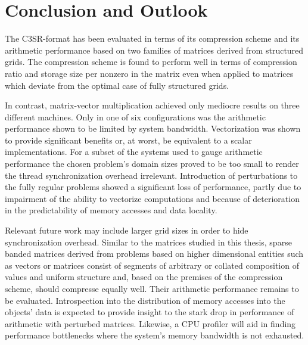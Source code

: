 \chapter{Conclusion and Outlook}

  The C3SR-format has been evaluated in terms of its compression scheme and its arithmetic performance based on two
  families of matrices derived from structured grids. The compression scheme is found to perform well in terms of
  compression ratio and storage size per nonzero in the matrix even when applied to matrices which deviate from the
  optimal case of fully structured grids.

  In contrast, matrix-vector multiplication achieved only mediocre results on three different machines. Only in one of
  six configurations was the arithmetic performance shown to be limited by system bandwidth. Vectorization was shown to
  provide significant benefits or, at worst, be equivalent to a scalar implementations. For a subset of the systems
  used to gauge arithmetic performance the chosen problem's domain sizes proved to be too small to render the thread
  synchronization overhead irrelevant. Introduction of perturbations to the fully regular problems showed a significant
  loss of performance, partly due to impairment of the ability to vectorize computations and because of deterioration in
  the predictability of memory accesses and data locality.

  Relevant future work may include larger grid sizes in order to hide synchronization overhead. Similar to the matrices
  studied in this thesis, sparse banded matrices derived from problems based on higher dimensional entities such as
  vectors or matrices consist of segments of arbitrary or collated composition of values and uniform structure and,
  based on the premises of the compression scheme, should compresse equally well. Their arithmetic performance remains
  to be evaluated. Introspection into the distribution of memory accesses into the objects' data is expected to
  provide insight to the stark drop in performance of arithmetic with perturbed matrices. Likewise, a CPU profiler will
  aid in finding performance bottlenecks where the system's memory bandwidth is not exhausted.
